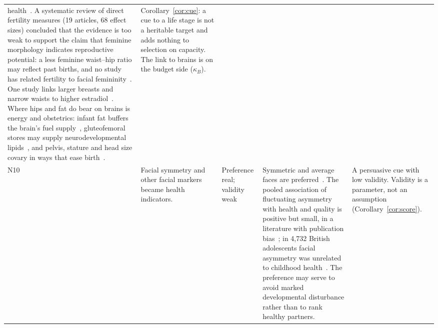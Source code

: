 \begin{table}[t]
\begin{tabularx}{\textwidth}{@{}P{0.022\textwidth}P{0.165\textwidth}P{0.085\textwidth}LP{0.20\textwidth}@{}}
health~\cite{lassek2018a,lassek2018b,bovet2019}. A systematic review of direct fertility measures (19 articles, 68 effect
sizes) concluded that the evidence is too weak to support the claim that feminine morphology indicates reproductive potential:
a less feminine waist--hip ratio may reflect past births, and no study has related fertility to facial
femininity~\cite{lidborg2025}. One study
links larger breasts and narrow waists to higher estradiol~\cite{jasienska2004}. Where hips and fat do bear on brains is energy
and obstetrics: infant fat buffers the brain's fuel supply~\cite{kuzawa1998,cunnane2003}, gluteofemoral stores may supply
neurodevelopmental lipids~\cite{lassek2008}, and pelvis, stature and head size covary in ways that ease
birth~\cite{fischer2015,mitteroecker2016,dunsworth2012}. &
Corollary~\ref{cor:cue}: a cue to a life stage is not a heritable target and adds nothing to selection on capacity. The link
to brains is on the budget side ($\kappa_B$).\\
\addlinespace
N10 & Facial symmetry and other facial markers became health indicators. & Preference real; validity weak &
Symmetric and average faces are preferred~\cite{rhodes2006}. The pooled association of fluctuating asymmetry with health and
quality is positive but small, in a literature with publication bias~\cite{vandongen2011}; in 4,732 British adolescents facial
asymmetry was unrelated to childhood health~\cite{pound2014}. The preference may serve to avoid marked developmental disturbance
rather than to rank healthy partners. &
A persuasive cue with low validity. Validity is a parameter, not an assumption (Corollary~\ref{cor:score}).\\
\bottomrule
\end{tabularx}
\end{table}
